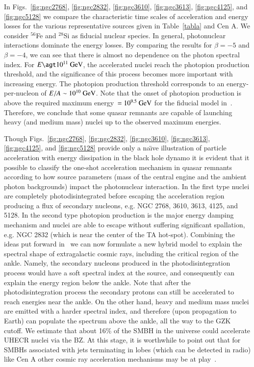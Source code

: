 \documentclass[aps,prd,twocolumn,superscriptaddress,tightenlines,nofootinbib]{revtex4-1}
\begin{document}
In Figs.~\ref{fig:ngc2768}, \ref{fig:ngc2832}, \ref{fig:ngc3610},
\ref{fig:ngc3613}, \ref{fig:ngc4125}, and \ref{fig:ngc5128} we compare the characteristic
time scales of acceleration and energy losses for the various
representative sources given in Table~\ref{tabla} and Cen A. We consider
$^{56}$Fe and $^{28}$Si as fiducial nuclear species. In general,  photonuclear interactions  dominate
the energy losses.  By comparing the results for $\beta = -5$ and
$\beta = -4$, we can see that there is almost no dependence on the
photon spectral index. For $E \agt 10^{11}~{\rm GeV}$, the accelerated
nuclei reach the photopion production threshold, and the
significance of this process becomes more important with increasing
energy.  The photopion production threshold corresponds to an
energy-per-nucleon of $E/A \sim 10^{10}~{\rm GeV}$. Note that the
onset of photopion production is above the required
maximum \mbox{energy $= 10^{9.5}~{\rm GeV}$} for the fiducial model
in~\cite{Unger:2015laa}. Therefore, we conclude that some quasar
remnants are capable of launching heavy (and medium mass) nuclei up to
the observed maximum energies.

Though Figs.~\ref{fig:ngc2768}, \ref{fig:ngc2832}, \ref{fig:ngc3610},
\ref{fig:ngc3613},  \ref{fig:ngc4125}, and \ref{fig:ngc5128}  provide only a na\"{\i}ve illustration of
particle acceleration with energy dissipation in the black hole dynamo
it is evident that it possible to classify the one-shot acceleration
mechanism in quasar remnants according to how source parameters (mass
of the central engine and the ambient photon backgrounds) impact the
photonuclear interaction. In the first type nuclei are completely
photodisintegrated before escaping the acceleration region producing a
flux of secondary nucleons, e.g. NGC 2768, 3610, 3613,  4125, and 5128. In the second type photopion production is
the major energy damping mechanism and nuclei are able to escape
without suffering significant spallation, e.g. NGC 2832 (which is near
the center of the TA hot-spot). Combining the ideas put
forward in~\cite{Aloisio:2013hya,Unger:2015laa} we can now formulate a
new hybrid model to explain the spectral shape of extragalactic cosmic
rays, including the critical region of the ankle. Namely, the
secondary nucleons produced in the photodisintegration process would
have a soft spectral index at the source, and consequently can explain
the energy region below the ankle.  Note that after the
photodisintegration process the secondary protons can still be
accelerated to reach energies near the ankle.  On the other hand, heavy and
medium mass nuclei are emitted with a harder spectral index, and
therefore (upon propagation to Earth) can populate the spectrum above
the ankle, all the way to the GZK cutoff.  We estimate that about 16\%
of the SMBH in the universe could accelerate UHECR nuclei via the
BZ. At this stage, it is worthwhile to point out  that for SMBHs associated with jets terminating in lobes (which can be detected in
radio) like Cen A other cosmic ray acceleration mechanisms may be at play~\cite{Biermann:1987ep,Rachen:1992pg,Rieger:2011rh}.
\end{document}
